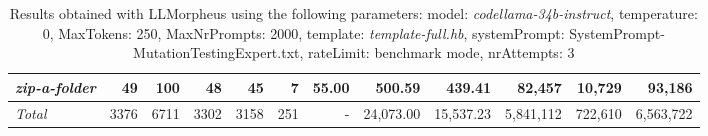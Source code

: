 \begin{table*}
{\begin{tabular}{l||r|r|r|r|r|r|r||r|r||r|r}
   \hline
   \textit{zip-a-folder} & 49 & 100 & 48 & 45 & 7 & 55.00 & 500.59 & 439.41 & 82,457 & 10,729 & 93,186 \\ 
   \hline
   \textit{Total} & 3376 & 6711 & 3302 & 3158 & 251 & - & 24,073.00  & 15,537.23 & 5,841,112 & 722,610 & 6,563,722 \\ 
 \end{tabular}
 }
 \caption{Results obtained with LLMorpheus using the following parameters: 
   model: \textit{codellama-34b-instruct}, 
   temperature: 0, 
   MaxTokens: 250, 
   MaxNrPrompts: 2000, 
   template: \textit{template-full.hb}, 
   systemPrompt: SystemPrompt-MutationTestingExpert.txt, 
   rateLimit: benchmark mode, 
   nrAttempts: 3  
 }
\end{table*}

